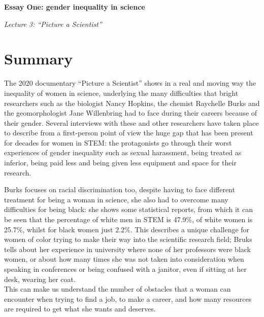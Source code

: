 \begin{flushleft}
    {\fontsize{16}{18}\selectfont\textbf{Essay One: gender inequality in science}} 

    \bigskip

    {\fontsize{14}{16}\selectfont \textit{Lecture 3: “Picture a Scientist”}}
\end{flushleft}

\section*{Summary}
The 2020 documentary “Picture a Scientist” \parencite{picture} shows in a real and moving way the inequality of women in science, underlying the many difficulties that bright researchers such as the biologist Nancy Hopkins, the chemist Raychelle Burks and the geomorphologist Jane Willenbring had to face during their careers because of their gender. 
Several interviews with these and other researchers have taken place to describe from a first-person point of view the huge gap that has been present for decades for women in STEM: the protagonists go through their worst experiences of gender inequality such as sexual harassment, being treated as inferior, being paid less and being given less equipment and space for their research. 

Burks focuses on racial discrimination too, despite having to face different treatment for being a woman in science, she also had to overcome many difficulties for being black: she shows some statistical reports, from which it can be seen that the percentage of white men in STEM is 47.9\%, of white women is 25.7\%, whilst for black women just 2.2\%. 
This describes a unique challenge for women of color trying to make their way into the scientific research field; Bruks tells about her experience in university where none of her professors were black women, or about how many times she was not taken into consideration when speaking in conferences or being confused with a janitor, even if sitting at her desk, wearing her coat. \\
This can make us understand the number of obstacles that a woman can encounter when trying to find a job, to make a career, and how many resources are required to get what she wants and deserves. 

